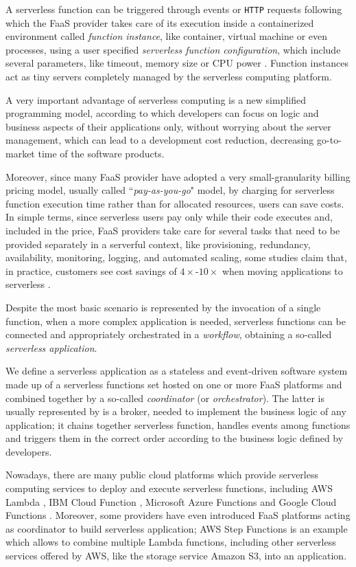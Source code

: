 \documentclass[12pt,a4paper]{report}
\newcommand{\ItalicQuotMark}[1]{``\textit{#1}"}
\begin{document}
A serverless function can be triggered through events or \texttt{HTTP} requests following which the FaaS provider takes care of its execution inside a containerized environment called \textit{function instance}, like container, virtual machine or even processes, using a user specified \textit{serverless function configuration}, which include several parameters, like timeout, memory size or CPU power \cite{COSE}. Function instances act as tiny servers completely managed by the serverless computing platform. 

A very important advantage of serverless computing is a new simplified programming model, according to which developers can focus on logic and business aspects of their applications only, without worrying about the server management, which can lead to a development cost reduction, decreasing go-to-market time of the software products.

Moreover, since many FaaS provider have adopted a very small-granularity billing pricing model, usually called \ItalicQuotMark{pay-as-you-go} model, by charging for serverless function execution time rather than for allocated resources, users can save costs. In simple terms, since serverless users pay only while their code executes and, included in the price, FaaS providers take care for several tasks that need to be provided separately in a serverful context, like  provisioning, redundancy, availability, monitoring, logging, and automated scaling, some studies claim that, in practice, customers see cost savings of $4\times$-$10\times$ when moving applications to serverless \cite{NextPhase}.

Despite the most basic scenario is represented by the invocation of a single function, when a more complex application is needed, serverless functions can be connected and appropriately orchestrated in a \textit{workflow}, obtaining a so-called \textit{serverless application}.

We define a serverless application as a stateless and event-driven software system made up of a serverless functions set hosted on one or more FaaS platforms and combined together by a so-called \textit{coordinator} (or \textit{orchestrator}). The latter is usually represented by is a broker, needed to implement the business logic of any application; it chains together serverless function, handles events among functions and triggers them in the correct order according to the business logic defined by developers. 

Nowadays, there are many public cloud platforms which provide serverless computing services to deploy and execute serverless functions, including AWS Lambda \cite{AWSLambda}, IBM Cloud Function \cite{IBMCloudFunctions}, Microsoft Azure Functions \cite{AzureFunctions} and Google Cloud Functions \cite{GoogleCloud}. Moreover, some providers have even introduced FaaS platforms acting as coordinator to build serverless application; AWS Step Functions is an example which allows to combine multiple Lambda functions, including other serverless services offered by AWS, like the storage service Amazon S3, into an application. 
\end{document}
